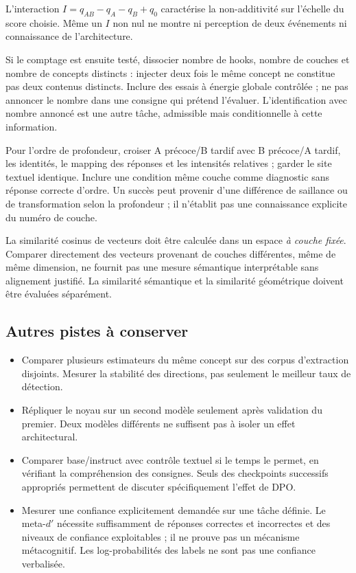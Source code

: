 \documentclass[10pt,a4paper]{article}
\begin{document}
L'interaction $I=q_{AB}-q_A-q_B+q_0$ caractérise la non-additivité sur l'échelle du score choisie. Même un $I$ non nul ne montre ni perception de deux événements ni connaissance de l'architecture.

Si le comptage est ensuite testé, dissocier nombre de hooks, nombre de couches et nombre de concepts distincts : injecter deux fois le même concept ne constitue pas deux contenus distincts. Inclure des essais à énergie globale contrôlée ; ne pas annoncer le nombre dans une consigne qui prétend l'évaluer. L'identification avec nombre annoncé est une autre tâche, admissible mais conditionnelle à cette information.

Pour l'ordre de profondeur, croiser A précoce/B tardif avec B précoce/A tardif, les identités, le mapping des réponses et les intensités relatives ; garder le site textuel identique. Inclure une condition même couche comme diagnostic sans réponse correcte d'ordre. Un succès peut provenir d'une différence de saillance ou de transformation selon la profondeur ; il n'établit pas une connaissance explicite du numéro de couche.

La similarité cosinus de vecteurs doit être calculée dans un espace \emph{à couche fixée}. Comparer directement des vecteurs provenant de couches différentes, même de même dimension, ne fournit pas une mesure sémantique interprétable sans alignement justifié. La similarité sémantique et la similarité géométrique doivent être évaluées séparément.

\subsection{Autres pistes à conserver}
\begin{itemize}
\item Comparer plusieurs estimateurs du même concept sur des corpus d'extraction disjoints. Mesurer la stabilité des directions, pas seulement le meilleur taux de détection.
\item Répliquer le noyau sur un second modèle seulement après validation du premier. Deux modèles différents ne suffisent pas à isoler un effet architectural.
\item Comparer base/instruct avec contrôle textuel si le temps le permet, en vérifiant la compréhension des consignes. Seuls des checkpoints successifs appropriés permettent de discuter spécifiquement l'effet de DPO.
\item Mesurer une confiance explicitement demandée sur une tâche définie. Le meta-$d'$ nécessite suffisamment de réponses correctes et incorrectes et des niveaux de confiance exploitables ; il ne prouve pas un mécanisme métacognitif. Les log-probabilités des labels ne sont pas une confiance verbalisée.
\end{itemize}
\end{document}
